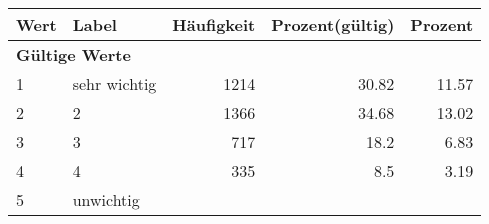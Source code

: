      \begin{longtable}{lXrrr}
     \toprule
     \textbf{Wert} & \textbf{Label} & \textbf{Häufigkeit} & \textbf{Prozent(gültig)} & \textbf{Prozent} \\
     \endhead
     \midrule
     \multicolumn{5}{l}{\textbf{Gültige Werte}}\\

     1 &
     \multicolumn{1}{X}{ sehr wichtig   } &


       \num{1214} &
       \num[round-mode=places,round-precision=2]{30.82} &
         \num[round-mode=places,round-precision=2]{11.57} \\

     2 &
     \multicolumn{1}{X}{ 2   } &


       \num{1366} &
       \num[round-mode=places,round-precision=2]{34.68} &
         \num[round-mode=places,round-precision=2]{13.02} \\

     3 &
     \multicolumn{1}{X}{ 3   } &


       \num{717} &
       \num[round-mode=places,round-precision=2]{18.2} &
         \num[round-mode=places,round-precision=2]{6.83} \\

     4 &
     \multicolumn{1}{X}{ 4   } &


       \num{335} &
       \num[round-mode=places,round-precision=2]{8.5} &
         \num[round-mode=places,round-precision=2]{3.19} \\

     5 &
     \multicolumn{1}{X}{ unwichtig   } &



\end{longtable}
